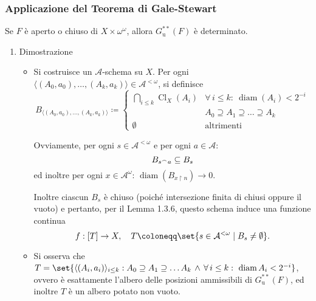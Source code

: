 \documentclass{article}
\newcommand{\1}{\mathds{1}}
\newcommand{\concat}{\null^{\frown}} %
\begin{document}
\subsubsection{Applicazione del Teorema di Gale-Stewart}
\label{sec:org682507b}

Se \(F\) è aperto o chiuso di \(X\times\omega^{\omega}\), allora \(G^{**}_{\text{u}}(F)\) è determinato.
\begin{enumerate}
\item Dimostrazione
\label{sec:org871b9fe}

\begin{itemize}
\item Si costruisce un \(\mathcal{A}\)-schema su \(X\). Per ogni \(\langle (A_{0},a_{0}),\dots,(A_{k},a_{k})\rangle \in \mathcal{A}^{<\omega}\), si definisce
\begin{equation*}
  B_{\langle (A_{0},a_{0}),\dots,(A_{k},a_{k})\rangle} \coloneqq \begin{cases}
  	\bigcap_{i\le k} \operatorname{Cl}_{X}(A_{i}) & \forall\,i\le k: \ \operatorname{diam}(A_{i})<2^{-i}\\
  	& A_{0} \supseteq A_{1}\supseteq \dots \supseteq A_{k}\\[1em]
  	\emptyset &\text{altrimenti}
      \end{cases}
\end{equation*}

Ovviamente, per ogni \(s \in \mathcal{A}^{<\omega}\) e per ogni \(a \in \mathcal{A}\):
\begin{equation*}
  	B_{s\concat a} \subseteq B_{s}
\end{equation*}
ed inoltre per ogni \(x \in \mathcal{A}^{\omega}\): \(\operatorname{diam}(B_{x\upharpoonright n})\to 0\).

Inoltre ciascun \(B_{s}\) è chiuso (poiché intersezione finita di chiusi oppure il vuoto) e pertanto, per il Lemma 1.3.6, questo schema induce una funzione continua
\begin{equation*}
  	f:[T]\to X,\quad T\coloneqq \set{s \in \mathcal{A}^{<\omega}\mid B_{s}\neq \emptyset}.
\end{equation*}

\item Si osserva che \(T=\set{\langle (A_{i},a_{i})\rangle_{i\le k}: A_{0}\supseteq A_{1}\supseteq \dots A_{k} \,\land\, \forall\, i\le k:\ \operatorname{diam}A_{i}<2^{-i}}\), ovvero è esattamente l'albero delle posizioni ammissibili di \(G^{**}_{\text{u}}(F)\), ed inoltre \(T\) è un albero potato non vuoto.


\end{itemize}
\end{enumerate}
\end{document}
